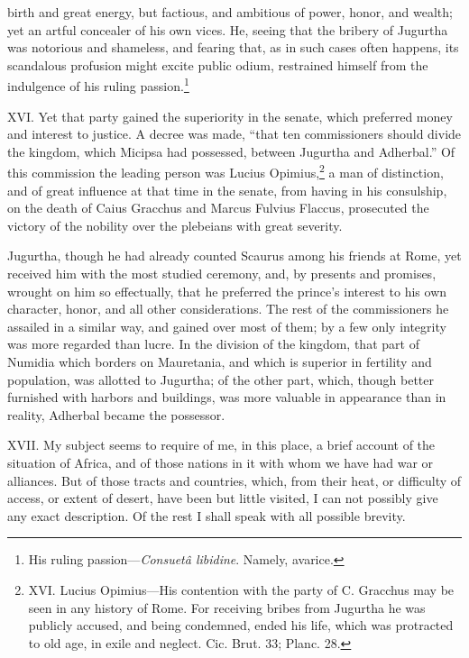 birth and great energy, but factious, and ambitious of power, honor,
and wealth; yet an artful concealer of his own vices. He, seeing that
the bribery of Jugurtha was notorious and shameless, and fearing that,
as in such cases often happens, its scandalous profusion might excite
public odium, restrained himself from the indulgence of his ruling
passion.\footnote{His ruling passion—\emph{Consuetâ libidine}. Namely, avarice.}

XVI. Yet that party gained the superiority in the senate, which
preferred money and interest to justice. A decree was made, ``that ten
commissioners should divide the kingdom, which Micipsa had possessed,
between Jugurtha and Adherbal.'' Of this commission the leading person
was Lucius Opimius,\footnote{XVI. Lucius Opimius—His contention with the party of C. Gracchus
may be seen in any history of Rome. For receiving bribes from Jugurtha
he was publicly accused, and being condemned, ended his life, which
was protracted to old age, in exile and neglect. Cic. Brut. 33;
Planc. 28.} a man of distinction, and of great influence
at that time in the senate, from having in his consulship, on the
death of Caius Gracchus and Marcus Fulvius Flaccus, prosecuted the
victory of the nobility over the plebeians with great severity.

Jugurtha, though he had already counted Scaurus among his friends at
Rome, yet received him with the most studied ceremony, and, by
presents and promises, wrought on him so effectually, that he
preferred the prince's interest to his own character, honor, and all
other considerations. The rest of the commissioners he assailed in a
similar way, and gained over most of them; by a few only integrity was
more regarded than lucre. In the division of the kingdom, that part of
Numidia which borders on Mauretania, and which is superior in
fertility and population, was allotted to Jugurtha; of the other part,
which, though better furnished with harbors and buildings, was more
valuable in appearance than in reality, Adherbal became the possessor.

XVII. My subject seems to require of me, in this place, a brief
account of the situation of Africa, and of those nations in it with
whom we have had war or alliances. But of those tracts and countries,
which, from their heat, or difficulty of access, or extent of desert,
have been but little visited, I can not possibly give any exact
description. Of the rest I shall speak with all possible brevity.

